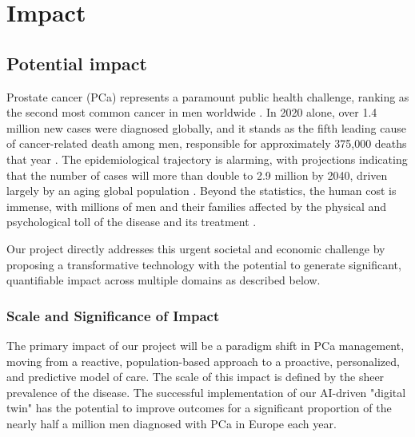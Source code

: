 \documentclass[11pt, a4paper]{article}
\begin{document}
\section{Impact}
\subsection{Potential impact }

Prostate cancer (PCa) represents a paramount public health challenge, ranking as the second most common cancer in men worldwide \cite{CaraccioloCastello2024,DulleaOSullivan2025}. In 2020 alone, over 1.4 million new cases were diagnosed globally, and it stands as the fifth leading cause of cancer-related death among men, responsible for approximately 375,000 deaths that year \cite{CereserEvangelista2023,GammelSolari2024,DharCendejasGomez2024}. The epidemiological trajectory is alarming, with projections indicating that the number of cases will more than double to 2.9 million by 2040, driven largely by an aging global population \cite{UdovicichJia2025,SungFerlay2021}.
Beyond the statistics, the human cost is immense, with millions of men and their families affected by the physical and psychological toll of the disease and its treatment \cite{NardoneMarmorino2024}.

Our project directly addresses this urgent societal and economic challenge by proposing a transformative technology with the potential to generate significant, quantifiable impact across multiple domains as described below.

\subsubsection{Scale and Significance of Impact}

The primary impact of our project will be a paradigm shift in PCa management, moving from a reactive, population-based approach to a proactive, personalized, and predictive model of care. The scale of this impact is defined by the sheer prevalence of the disease. The successful implementation of our AI-driven "digital twin" has the potential to improve outcomes for a significant proportion of the nearly half a million men diagnosed with PCa in Europe each year.
\end{document}
